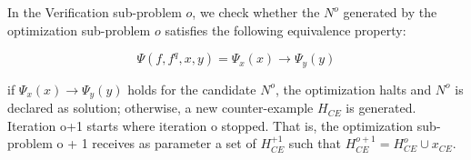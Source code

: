 In the Verification sub-problem $o$, we check whether the $N^o$ generated by the optimization sub-problem $o$ satisfies the following equivalence property:

\[\Psi(f,f^q, x,y)=\Psi_x(x)\rightarrow \Psi_y(y)\]

if  $\Psi_x(x)\rightarrow \Psi_y(y)$ holds for the candidate $N^o$, the optimization halts and $N^o$ is declared as solution; otherwise, a new counter-example $H_{CE}$ is generated. Iteration o+1 starts where iteration o stopped. That is, the optimization sub-problem o + 1 receives as parameter a set of $H^{+1}_{CE}$ such that $H^{o+1}_{CE}=H^o_{CE}\cup x_{CE}$.

